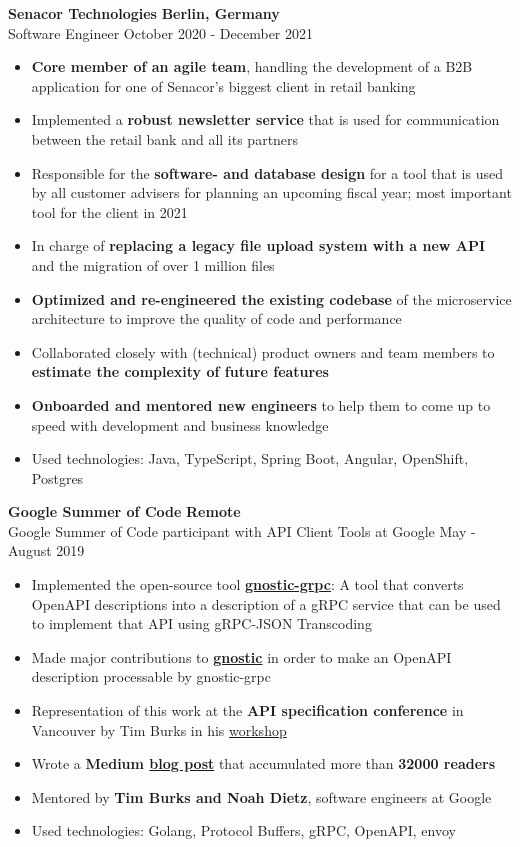 \documentclass{memoir}
\begin{document}
\noindent \textbf{Senacor Technologies}
\hfill
\textbf{Berlin, Germany} \\
Software Engineer
\hfill
October 2020 - December 2021
\begin{itemize}[noitemsep]
  \item \textbf{Core member of an agile team}, handling the development of a B2B application for one of Senacor’s biggest client in retail banking
  \item Implemented a \textbf{robust newsletter service} that is used for communication between the retail bank and all its partners
  \item Responsible for the \textbf{software- and database design} for a tool that is used by all customer advisers for planning an upcoming fiscal year; most important tool for the client in 2021
  \item In charge of \textbf{replacing a legacy file upload system with a new API} and the migration of over 1 million files
  \item \textbf{Optimized and re-engineered the existing codebase} of the microservice architecture to improve the quality of code and performance
  \item Collaborated closely with (technical) product owners and team members to \textbf{estimate the complexity of future features}
  \item \textbf{Onboarded and mentored new engineers} to help them to come up to speed with development and business knowledge
  \item Used technologies: Java, TypeScript, Spring Boot, Angular, OpenShift, Postgres
\end{itemize}

\noindent \textbf{Google Summer of Code}
\hfill
\textbf{Remote} \\
Google Summer of Code participant with API Client Tools at Google
\hfill
May - August 2019
\begin{itemize}[noitemsep]
  \item Implemented the open-source tool \textbf{\href{https://www.github.com/google/gnostic-grpc}{gnostic-grpc}}: A tool that converts OpenAPI descriptions into a description of a gRPC service that can be used to implement that API using gRPC-JSON Transcoding
  \item Made major contributions to \textbf{\href{https://www.github.com/google/gnostic}{gnostic}} in order to make an OpenAPI description processable by gnostic-grpc
  \item Representation of this work at the \textbf{API specification conference} in Vancouver by Tim Burks in his \href{https://asc2019.sched.com/event/T6u9}{workshop} 
  \item Wrote a \textbf{Medium \href{https://levelup.gitconnected.com/how-to-build-a-rest-api-with-grpc-and-get-the-best-of-two-worlds-9a4e491f30ae}{blog post}} that accumulated more than \textbf{32000 readers} 
  \item Mentored by \textbf{Tim Burks and Noah Dietz}, software engineers at Google
  \item Used technologies: Golang, Protocol Buffers, gRPC, OpenAPI, envoy
\end{itemize}
\end{document}
